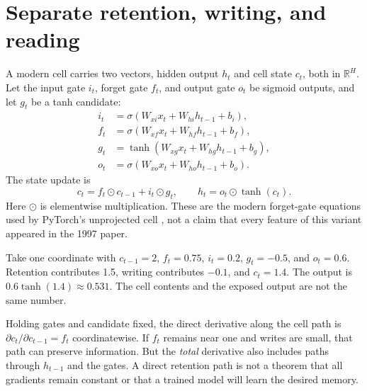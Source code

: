 \section{Separate retention, writing, and reading}

A modern  cell carries two vectors,
hidden output $h_t$ and cell state $c_t$, both in $\mathbb R^H$.
Let the input gate $i_t$, forget gate $f_t$, and output gate $o_t$ be
sigmoid outputs, and let $g_t$ be a tanh candidate:
\begin{align}
i_t&=\sigma(W_{xi}x_t+W_{hi}h_{t-1}+b_i),\\
f_t&=\sigma(W_{xf}x_t+W_{hf}h_{t-1}+b_f),\\
g_t&=\tanh(W_{xg}x_t+W_{hg}h_{t-1}+b_g),\\
o_t&=\sigma(W_{xo}x_t+W_{ho}h_{t-1}+b_o).
\end{align}
The state update is
\begin{equation}
c_t=f_t\odot c_{t-1}+i_t\odot g_t,\qquad
h_t=o_t\odot\tanh(c_t).
\label{eq:lstm}
\end{equation}
Here $\odot$ is elementwise multiplication. These are the modern
forget-gate equations used by PyTorch's unprojected cell \cite{lstm-api},
not a claim that every feature of this variant appeared in the 1997 paper.


Take one coordinate with $c_{t-1}=2$, $f_t=0.75$, $i_t=0.2$,
$g_t=-0.5$, and $o_t=0.6$. Retention contributes 1.5, writing contributes
$-0.1$, and $c_t=1.4$. The output is $0.6\tanh(1.4)\approx0.531$.
The cell contents and the exposed output are not the same number.

Holding gates and candidate fixed, the direct derivative along the cell
path is $\partial c_t/\partial c_{t-1}=f_t$ coordinatewise.
If $f_t$ remains near one and writes are small, that path can preserve
information. But the \emph{total} derivative also includes paths through
$h_{t-1}$ and the gates. A direct retention path is not a theorem that
all gradients remain constant or that a trained model will learn the desired memory.


